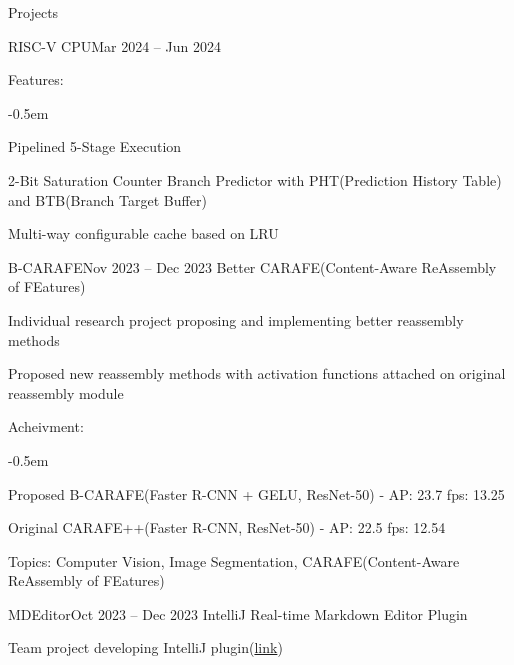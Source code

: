 \documentclass{resume}
\begin{document}
\begin{rSection}{Projects}
\begin{rSubsection}{RISC-V CPU}{Mar 2024 -- Jun 2024}
        \item Features:
        \vspace{-0.5em}
        \begin{list}{--}{\setlength{\rightmargin}{1.5em}}
            \itemsep -0.5em

            \item Pipelined 5-Stage Execution

            \item 2-Bit Saturation Counter Branch Predictor with PHT(Prediction History Table) and BTB(Branch Target Buffer)

            \item Multi-way configurable cache based on LRU
        \end{list}
    \end{rSubsection}

    \begin{rSubsection}{B-CARAFE}{Nov 2023 -- Dec 2023}
        Better CARAFE(Content-Aware ReAssembly of FEatures)

        \item Individual research project proposing and implementing better reassembly methods

        \item Proposed new reassembly methods with activation functions attached on original reassembly module

        \item Acheivment:
        \vspace{-0.5em}
        \begin{list}{--}{\setlength{\rightmargin}{1.5em}}
            \itemsep -0.5em

            \item Proposed B-CARAFE(Faster R-CNN + GELU, ResNet-50) - AP: 23.7 fps: 13.25

            \item Original CARAFE++(Faster R-CNN, ResNet-50) - AP: 22.5 fps: 12.54
        \end{list}

        \item Topics: Computer Vision, Image Segmentation, CARAFE(Content-Aware ReAssembly of FEatures)
    \end{rSubsection}

    \begin{rSubsection}{MDEditor}{Oct 2023 -- Dec 2023}
        IntelliJ Real-time Markdown Editor Plugin

        \item Team project developing IntelliJ plugin(\href{https://github.com/minsusun/csed332-project}{link})


\end{rSubsection}
\end{rSection}
\end{document}
